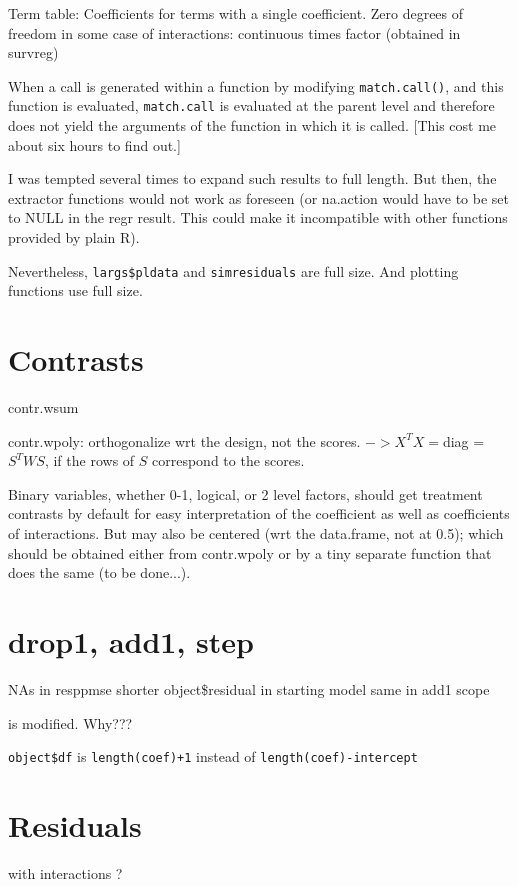 \documentclass[11pt]{article}
\def\T{\texttt}
\begin{document}
Term table:
Coefficients for terms with a single coefficient.
Zero degrees of freedom in some case of interactions: continuous times
factor (obtained in survreg)

When a call is generated within a function by modifying \T{match.call()}, 
and this function is evaluated, 
\T{match.call} is evaluated at the parent level and therefore does not 
yield the arguments of the function in which it is called. 
[This cost me about six hours to find out.]

I was tempted several times to expand such results to full length.
But then, the extractor functions would not work as foreseen
(or na.action would have to be set to NULL in the regr result.
This could make it incompatible with other functions provided by plain R).

Nevertheless, \T{largs\$pldata} and \T{simresiduals} are full size.
And plotting functions use full size.
\section{Contrasts}
contr.wsum

contr.wpoly: orthogonalize wrt the design, not the scores.
$-> X^TX=$diag = $S^T W S$, if the rows of $S$ correspond to the scores.

Binary variables, whether 0-1, logical, or 2 level factors,
should get treatment contrasts by default for easy interpretation 
of the coefficient as well as coefficients of interactions.
But may also be centered (wrt the data.frame, not at 0.5);
which should be obtained either from contr.wpoly or by a tiny separate
function that does the same (to be done...).

\section{drop1, add1, step}
NAs 
\Itm in resppmse \Arrow shorter object\$residual
\Itm in starting model \Arrow same
\Itm in add1 scope 

is modified. Why???

\T{object\$df} is \T{length(coef)+1} instead of
\T{length(coef)-intercept}
\section{Residuals}
with interactions ?
\end{document}
